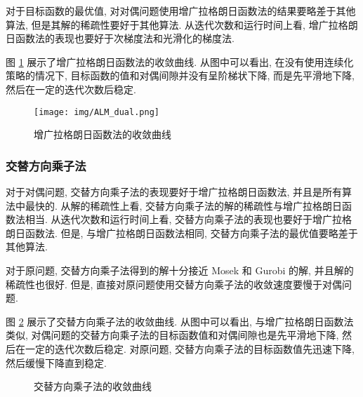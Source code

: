\documentclass{article}
\begin{document}
对于目标函数的最优值, 对对偶问题使用增广拉格朗日函数法的结果要略差于其他算法, 但是其解的稀疏性要好于其他算法. 从迭代次数和运行时间上看, 增广拉格朗日函数法的表现也要好于次梯度法和光滑化的梯度法.

图 \ref{fig:ALM} 展示了增广拉格朗日函数法的收敛曲线. 从图中可以看出, 在没有使用连续化策略的情况下, 目标函数的值和对偶间隙并没有呈阶梯状下降, 而是先平滑地下降, 然后在一定的迭代次数后稳定.

\begin{figure}[h]
    \centering
    \texttt{[image: img/ALM\_dual.png]}
    \caption{增广拉格朗日函数法的收敛曲线}
    \label{fig:ALM}
\end{figure}

\subsubsection{交替方向乘子法}

对于对偶问题, 交替方向乘子法的表现要好于增广拉格朗日函数法, 并且是所有算法中最快的. 从解的稀疏性上看, 交替方向乘子法的解的稀疏性与增广拉格朗日函数法相当. 从迭代次数和运行时间上看, 交替方向乘子法的表现也要好于增广拉格朗日函数法. 但是, 与增广拉格朗日函数法相同, 交替方向乘子法的最优值要略差于其他算法.

对于原问题, 交替方向乘子法得到的解十分接近 Mosek 和 Gurobi 的解, 并且解的稀疏性也很好. 但是, 直接对原问题使用交替方向乘子法的收敛速度要慢于对偶问题.

图 \ref{fig:ADMM} 展示了交替方向乘子法的收敛曲线. 从图中可以看出, 与增广拉格朗日函数法类似, 对偶问题的交替方向乘子法的目标函数值和对偶间隙也是先平滑地下降, 然后在一定的迭代次数后稳定. 对原问题, 交替方向乘子法的目标函数值先迅速下降, 然后缓慢下降直到稳定.

\begin{figure}[h]
    \centering
    \caption{交替方向乘子法的收敛曲线}
    \label{fig:ADMM}
\end{figure}
\end{document}

